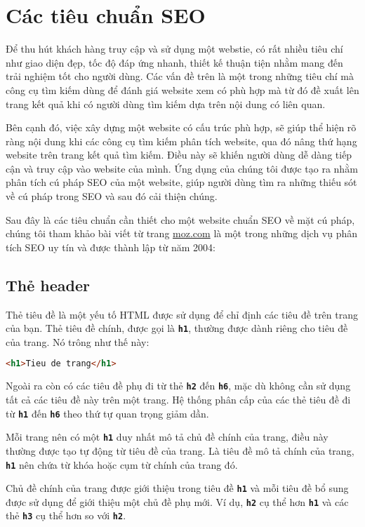 \chapter{Các tiêu chuẩn SEO}
Để thu hút khách hàng truy cập và sử dụng một webstie, có rất nhiều tiêu chí như giao diện đẹp, tốc độ đáp ứng nhanh, thiết kế thuận tiện nhằm mang đến trải nghiệm tốt cho người dùng. Các vấn đề trên là một trong những tiêu chí mà công cụ tìm kiếm dùng để đánh giá website xem có phù hợp mà từ đó đề xuất lên trang kết quả khi có người dùng tìm kiếm dựa trên nội dung có liên quan.
\par
Bên cạnh đó, việc xây dựng một website có cấu trúc phù hợp, sẽ giúp thể hiện rõ ràng nội dung khi các công cụ tìm kiếm phân tích website, qua đó nâng thứ hạng website trên trang kết quả tìm kiếm. Điều này sẽ khiến người dùng dễ dàng tiếp cận và truy cập vào website của mình. Ứng dụng của chúng tôi được tạo ra nhằm phân tích cú pháp SEO của một website, giúp người dùng tìm ra những thiếu sót về cú pháp trong SEO và sau đó cải thiện chúng.
\par
Sau đây là các tiêu chuẩn cần thiết cho một website chuẩn SEO về mặt cú pháp, chúng tôi tham khảo bài viết từ trang \href{https://moz.com/}{moz.com} là một trong những dịch vụ phân tích SEO uy tín và được thành lập từ năm 2004\cite{seo}:
\section{Thẻ header}
Thẻ tiêu đề là một yếu tố HTML được sử dụng để chỉ định các tiêu đề trên trang của bạn. Thẻ tiêu đề chính, được gọi là \textbf{\texttt{h1}}, thường được dành riêng cho tiêu đề của trang. Nó trông như thế này:
\begin{lstlisting}[language=html]
<h1>Tieu de trang</h1>
\end{lstlisting}
\par
Ngoài ra còn có các tiêu đề phụ đi từ thẻ \textbf{\texttt{h2}} đến \textbf{\texttt{h6}}, mặc dù không cần sử dụng tất cả các tiêu đề này trên một trang. Hệ thống phân cấp của các thẻ tiêu đề đi từ \textbf{\texttt{h1}} đến \textbf{\texttt{h6}} theo thứ tự quan trọng giảm dần.
\par
Mỗi trang nên có một \textbf{\texttt{h1}} duy nhất mô tả chủ đề chính của trang, điều này thường được tạo tự động từ tiêu đề của trang. Là tiêu đề mô tả chính của trang, \textbf{\texttt{h1}} nên chứa từ khóa hoặc cụm từ chính của trang đó.
\par
Chủ đề chính của trang được giới thiệu trong tiêu đề \textbf{\texttt{h1}} và mỗi tiêu đề bổ sung được sử dụng để giới thiệu một chủ đề phụ mới. Ví dụ, \textbf{\texttt{h2}} cụ thể hơn \textbf{\texttt{h1}} và các thẻ \textbf{\texttt{h3}} cụ thể hơn so với \textbf{\texttt{h2}}.
